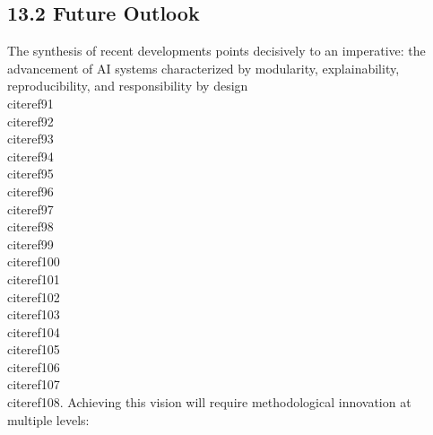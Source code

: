 \documentclass[11pt]{article}
\begin{document}
\subsection{13.2 Future Outlook}

The synthesis of recent developments points decisively to an imperative: the advancement of AI systems characterized by modularity, explainability, reproducibility, and responsibility by design~\\cite{ref91}\\cite{ref92}\\cite{ref93}\\cite{ref94}\\cite{ref95}\\cite{ref96}\\cite{ref97}\\cite{ref98}\\cite{ref99}\\cite{ref100}\\cite{ref101}\\cite{ref102}\\cite{ref103}\\cite{ref104}\\cite{ref105}\\cite{ref106}\\cite{ref107}\\cite{ref108}. Achieving this vision will require methodological innovation at multiple levels:
\end{document}
